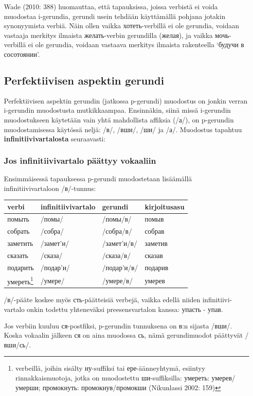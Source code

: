 \documentclass[]{scrreprt}
\begin{document}
Wade (2010: 388) huomauttaa, että tapauksissa, joissa verbistä ei voida
muodostaa i-gerundia, gerundi usein tehdään käyttämällä pohjana jotakin
synonyymista verbiä. Näin ollen vaikka хотеть-verbillä ei ole gerundia,
voidaan vastaaja merkitys ilmaista желать-verbin gerundilla (желая), ja
vaikka мочь-verbillä ei ole gerundia, voidaan vastaava merkitys ilmaista
rakenteella `будучи в сосотоянии'.

\subsection{Perfektiivisen aspektin
gerundi}\label{perfektiivisen-aspektin-gerundi}

Perfektiivisen aspektin gerundin (jatkossa p-gerundi) muodostus on
jonkin verran i-gerundin muodostusta mutkikkaampaa. Ensinnäkin, siinä
missä i-gerundin muodostukseen käytetään vain yhtä mahdollista affiksia
(/а/), on p-gerundin muodostamisessa käytössä neljä: /в/, /вши/, /ши/ ja
/а/. Muodostus tapahtuu \textbf{infinitiivivartalosta} seuraavasti:

\subsubsection{Jos infinitiivivartalo päättyy
vokaaliin}\label{jos-infinitiivivartalo-puxe4uxe4ttyy-vokaaliin}

Ensimmäisessä tapauksessa p-gerundi muodostetaan lisäämällä
infinitiivivartaloon /в/-tunnus:

\begin{longtable}[c]{@{}llll@{}}
\toprule
verbi & infinitiivivartalo & gerundi & kirjoitusasu\tabularnewline
\midrule
\endhead
помыть & /помы/ & /помы/в/ & помыв\tabularnewline
собрать & /собра/ & /собра/в/ & собрав\tabularnewline
заметить & /замет'и/ & /замет'и/в/ & заметив\tabularnewline
сказать & /сказа/ & /сказа/в/ & сказав\tabularnewline
подарить & /подар'и/ & /подар'и/в/ & подарив\tabularnewline
умереть\footnote{verbeillä, joihin sisälty ну-suffiksi tai
  ере-äänneyhtymä, esiintyy rinnakkaismuotoja, jotka on muodostettu
  ши-suffiksilla: умереть: умерев/умерши; промокнуть: промокнув/промокши
  (Nikunlassi 2002: 159)} & /умере/ & /умере/в/ & умерев\tabularnewline
\bottomrule
\end{longtable}

/в/-pääte koskee myös сть-päätteisiä verbejä, vaikka edellä niiden
infinitiivi- vartalo onkin todettu yhteneväksi preesensvartalon kanssa:
упасть - упав.

Jos verbiin kuuluu ся-postfiksi, p-gerundin tunnuksena on в:n sijasta
/вши/. Koska vokaalin jälkeen ся on aina muodossa сь, nämä gerundimuodot
päättyvät /вши/сь/.
\end{document}
